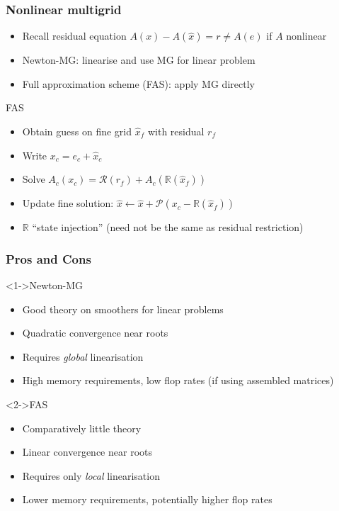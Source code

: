 \documentclass[presentation]{beamer}
\begin{document}
\begin{frame}
  \frametitle{Nonlinear multigrid}
  \begin{itemize}
  \item Recall residual equation $A(x) - A(\hat{x}) = r \neq A(e)$ if
    $A$ nonlinear
  \item Newton-MG: linearise and use MG for linear problem
  \item Full approximation scheme (FAS): apply MG directly
  \end{itemize}

  \begin{block}{FAS}
    \begin{itemize}
    \item Obtain guess on fine grid $\hat{x}_f$ with residual $r_f$
    \item Write $x_c = e_c + \hat{x}_c$
    \item Solve $A_c(x_c) = \mathcal{R}(r_f) + A_c(\mathbb{R}(\hat{x}_f))$
    \item Update fine solution: $\hat{x} \leftarrow \hat{x} +
      \mathcal{P}(x_c - \mathbb{R}(\hat{x}_f))$
    \item $\mathbb{R}$ ``state injection'' (need not be the same as
      residual restriction)
    \end{itemize}
  \end{block}
\end{frame}

\begin{frame}
  \frametitle{Pros and Cons}
    \begin{block}<1->{Newton-MG}
      \begin{itemize}
      \item Good theory on smoothers for linear problems
      \item Quadratic convergence near roots
      \item Requires \emph{global} linearisation
      \item High memory requirements, low flop rates (if using
        assembled matrices)
      \end{itemize}
    \end{block}
    \begin{block}<2->{FAS}
      \begin{itemize}
      \item Comparatively little theory
      \item Linear convergence near roots
      \item Requires only \emph{local} linearisation
      \item Lower memory requirements, potentially higher flop rates
      \end{itemize}
    \end{block}
\end{frame}
\end{document}
